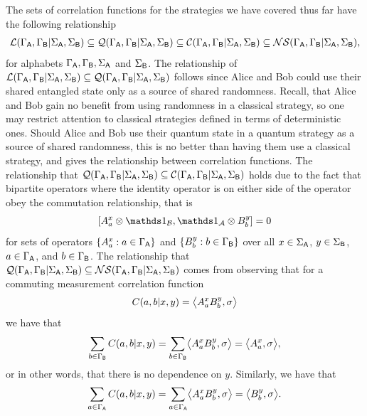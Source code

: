 The sets of correlation functions for the strategies we have covered thus far have the following relationship 
\begin{align}
	\mathcal{L}(\Gamma_{\mathsf{A}}, \Gamma_{\mathsf{B}} | \Sigma_{\mathsf{A}}, \Sigma_{\mathsf{B}}) \subseteq \mathcal{Q}(\Gamma_{\mathsf{A}}, \Gamma_{\mathsf{B}} | \Sigma_{\mathsf{A}}, \Sigma_{\mathsf{B}}) \subseteq \mathcal{C}(\Gamma_{\mathsf{A}}, \Gamma_{\mathsf{B}} | \Sigma_{\mathsf{A}}, \Sigma_{\mathsf{B}}) \subseteq \mathcal{NS}(\Gamma_{\mathsf{A}}, \Gamma_{\mathsf{B}} | \Sigma_{\mathsf{A}}, \Sigma_{\mathsf{B}}),
\end{align}
for alphabets $\Gamma_{\mathsf{A}}, \Gamma_{\mathsf{B}}, \Sigma_{\mathsf{A}}$ and $\Sigma_{\mathsf{B}}$. The relationship of $\mathcal{L}(\Gamma_{\mathsf{A}}, \Gamma_{\mathsf{B}} | \Sigma_{\mathsf{A}}, \Sigma_{\mathsf{B}}) \subseteq \mathcal{Q}(\Gamma_{\mathsf{A}}, \Gamma_{\mathsf{B}} | \Sigma_{\mathsf{A}}, \Sigma_{\mathsf{B}})$ follows since Alice and Bob could use their shared entangled state only as a source of shared randomness. Recall, that Alice and Bob gain no benefit from using randomness in a classical strategy, so one may restrict attention to classical strategies defined in terms of deterministic ones. Should Alice and Bob use their quantum state in a quantum strategy as a source of shared randomness, this is no better than having them use a classical strategy, and gives the relationship between correlation functions. The relationship that $\mathcal{Q}(\Gamma_{\mathsf{A}}, \Gamma_{\mathsf{B}} | \Sigma_{\mathsf{A}}, \Sigma_{\mathsf{B}}) \subseteq \mathcal{C}(\Gamma_{\mathsf{A}}, \Gamma_{\mathsf{B}} | \Sigma_{\mathsf{A}}, \Sigma_{\mathsf{B}})$ holds due to the fact that bipartite operators where the identity operator is on either side of the operator obey the commutation relationship, that is
\begin{align}
	\left[ A_a^x \otimes \I_{\B}, \I_{\A} \otimes B_b^y \right] = 0
\end{align}
for sets of operators $\{A_a^x : a \in \Gamma_{\mathsf{A}}\}$ and $\{B_b^y : b \in \Gamma_{\mathsf{B}}\}$ over all $x \in \Sigma_{\mathsf{A}}$, $y \in \Sigma_{\mathsf{B}}$, $a \in \Gamma_{\mathsf{A}}$, and $b \in \Gamma_{\mathsf{B}}$. The relationship that $\mathcal{Q}(\Gamma_{\mathsf{A}}, \Gamma_{\mathsf{B}} | \Sigma_{\mathsf{A}}, \Sigma_{\mathsf{B}}) \subseteq \mathcal{NS}(\Gamma_{\mathsf{A}}, \Gamma_{\mathsf{B}} | \Sigma_{\mathsf{A}}, \Sigma_{\mathsf{B}})$ comes from observing that for a commuting measurement correlation function
\begin{align}
	C(a,b|x,y) = \bigl\langle A_a^x B_b^y, \sigma \bigr\rangle
\end{align}
we have that
\begin{align}
	\sum_{b \in \Gamma_{\mathsf{B}}} C(a,b|x,y) = \sum_{b \in \Gamma_{\mathsf{B}}} \bigl\langle A_a^x B_b^y, \sigma \bigr\rangle = \bigl\langle A_a^x, \sigma \bigr\rangle,
\end{align}
or in other words, that there is no dependence on $y$. Similarly, we have that
\begin{align}
	\sum_{a \in \Gamma_{\mathsf{A}}} C(a,b|x,y) = \sum_{a \in \Gamma_{\mathsf{A}}} \bigl\langle A_a^x B_b^y, \sigma \bigr\rangle = \bigl\langle B_b^y, \sigma \bigr\rangle.
\end{align}


